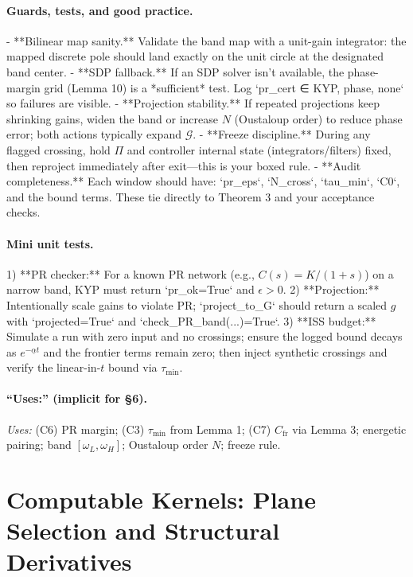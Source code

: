 \documentclass[10pt]{article}
\begin{document}
\paragraph{Guards, tests, and good practice.}
- **Bilinear map sanity.** Validate the band map with a unit-gain integrator: the mapped discrete pole should land exactly on the unit circle at the designated band center.  
- **SDP fallback.** If an SDP solver isn’t available, the phase-margin grid (Lemma 10) is a *sufficient* test. Log `pr\_cert ∈ {KYP, phase, none}` so failures are visible.  
- **Projection stability.** If repeated projections keep shrinking gains, widen the band or increase \(N\) (Oustaloup order) to reduce phase error; both actions typically expand \(\mathcal G\).  
- **Freeze discipline.** During any flagged crossing, hold \(\Pi\) and controller internal state (integrators/filters) fixed, then reproject immediately after exit—this is your boxed rule.  
- **Audit completeness.** Each window should have: `pr\_eps`, `N\_cross`, `tau\_min`, `C0`, and the bound terms. These tie directly to Theorem 3 and your acceptance checks.

\paragraph{Mini unit tests.}
1) **PR checker:** For a known PR network (e.g., \(C(s)=K/(1+s)\)) on a narrow band, KYP must return `pr\_ok=True` and \(\epsilon>0\).  
2) **Projection:** Intentionally scale gains to violate PR; `project\_to\_G` should return a scaled \(g\) with `projected=True` and `check\_PR\_band(...)=True`.  
3) **ISS budget:** Simulate a run with zero input and no crossings; ensure the logged bound decays as \(e^{-\underline\alpha t}\) and the frontier terms remain zero; then inject synthetic crossings and verify the linear-in-\(t\) bound via \(\tau_{\min}\).

\paragraph{“Uses:” (implicit for §6).}
\emph{Uses: } (C6) PR margin; (C3) \(\tau_{\min}\) from Lemma 1; (C7) \(C_{\mathrm{fr}}\) via Lemma 3; energetic pairing; band \([\omega_L,\omega_H]\); Oustaloup order \(N\); freeze rule.


\section{Computable Kernels: Plane Selection and Structural Derivatives}\label{sec:kernels}
\end{document}
